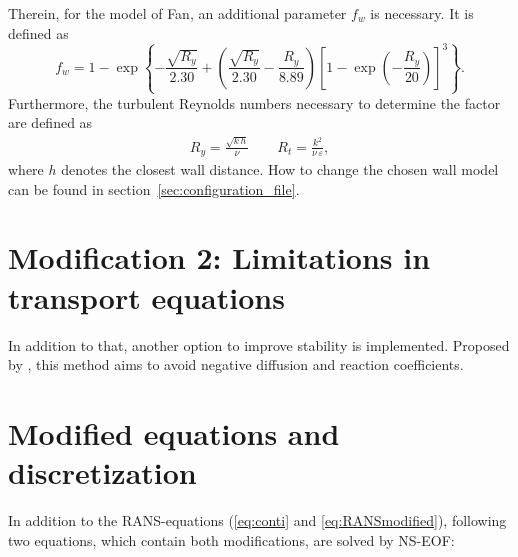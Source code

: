 \noii Therein, for the model of Fan, an additional parameter $f_w$ is necessary. It is defined as
\begin{equation}
f_w = 1 - \exp{\left\{ -\frac{\sqrt{R_y}}{2.30} + \left( \frac{\sqrt{R_y}}{2.30} - \frac{R_y}{8.89} \right) \left\lbrack 1-\exp{\left( -\frac{R_y}{20} \right)} \right\rbrack^3  \right\}}.
\end{equation}
Furthermore, the turbulent Reynolds numbers necessary to determine the factor are defined as
\begin{equation}
	\begin{split}
		R_y = \frac{\sqrt{k\,h}}{\nu} \qquad R_t = \frac{k^2}{\nu\,\varepsilon},	
	\end{split}
\end{equation}
where $h$ denotes the closest wall distance. How to change the chosen wall model can be found in section~\ref{sec:configuration_file}.



\section{Modification 2: Limitations in transport equations} %
\label{sec:modification_2_limitation_of_source_and_reaction_terms_in_transport_equtions}


In addition to that, another option to improve stability is implemented. Proposed by \citep{kuzmin2007}, this method aims to avoid negative diffusion and reaction coefficients.



\section{Modified equations and discretization} %
\label{sec:modified_equations_and_discretization}

In addition to the RANS-equations (\ref{eq:conti} and \ref{eq:RANSmodified}), following two equations, which contain both modifications, are solved by NS-EOF:

